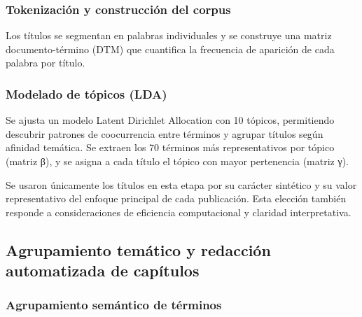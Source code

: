 \documentclass[
  letterpaper,
  DIV=11,
  numbers=noendperiod,
  oneside]{scrreprt}
\begin{document}
\subsubsection{Tokenización y construcción del
corpus}\label{tokenizaciuxf3n-y-construcciuxf3n-del-corpus}

Los títulos se segmentan en palabras individuales y se construye una
matriz documento-término (DTM) que cuantifica la frecuencia de aparición
de cada palabra por título.

\subsubsection{Modelado de tópicos
(LDA)}\label{modelado-de-tuxf3picos-lda}

Se ajusta un modelo Latent Dirichlet Allocation con 10 tópicos,
permitiendo descubrir patrones de coocurrencia entre términos y agrupar
títulos según afinidad temática. Se extraen los 70 términos más
representativos por tópico (matriz β), y se asigna a cada título el
tópico con mayor pertenencia (matriz γ).

\begin{tcolorbox}[enhanced jigsaw, colbacktitle=quarto-callout-note-color!10!white, breakable, leftrule=.75mm, coltitle=black, title=\textcolor{quarto-callout-note-color}{\faInfo}\hspace{0.5em}{Nota metodológica:}, opacityback=0, bottomrule=.15mm, colframe=quarto-callout-note-color-frame, opacitybacktitle=0.6, colback=white, toptitle=1mm, bottomtitle=1mm, titlerule=0mm, arc=.35mm, rightrule=.15mm, toprule=.15mm, left=2mm]

Se usaron únicamente los títulos en esta etapa por su carácter sintético
y su valor representativo del enfoque principal de cada publicación.
Esta elección también responde a consideraciones de eficiencia
computacional y claridad interpretativa.

\end{tcolorbox}

\subsection{Agrupamiento temático y redacción automatizada de
capítulos}\label{agrupamiento-temuxe1tico-y-redacciuxf3n-automatizada-de-capuxedtulos}

\subsubsection{Agrupamiento semántico de
términos}\label{agrupamiento-semuxe1ntico-de-tuxe9rminos}
\end{document}
